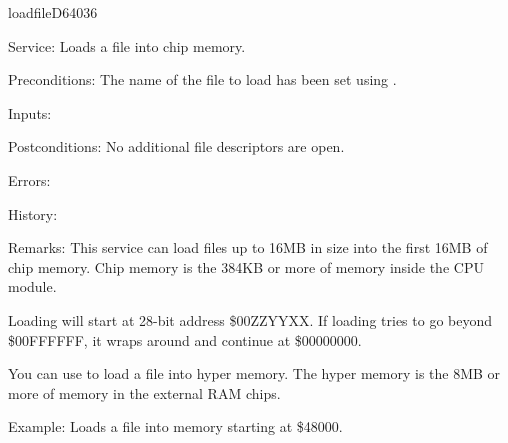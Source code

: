 \newpage
\begin{hyppotrap}{loadfile}{D640}{36}
\item [Service:]
  Loads a file into chip memory.
\item [Preconditions:]
  The name of the file to load has been set using .
\item [Inputs:]
\item [Postconditions:]
  No additional file descriptors are open.
\item [Errors:]
\item [History:]
\item [Remarks:]
  This service can load files up to 16MB in size into the first 16MB of chip
  memory. Chip memory is the 384KB or more of memory inside the CPU module.

  Loading will start at 28-bit address \$00ZZYYXX. If loading tries to go beyond
  \$00FFFFFF, it wraps around and continue at \$00000000.

  You can use  to load a file into hyper memory. The
  hyper memory is the 8MB or more of memory in the external RAM chips.
\item [Example:]
  Loads a file into memory starting at \$48000.
\end{hyppotrap}


